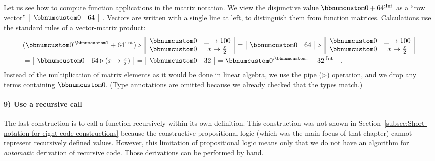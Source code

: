 Let us see how to compute function applications in the matrix notation.
We view the disjunctive value $\bbnum 0+64^{:\text{Int}}$ as a \textsf{``}row
vector\textsf{''} $\,\begin{array}{|cc|}
\bbnum 0 & 64\end{array}$~. Vectors are written with a single line at left, to distinguish
them from function matrices. Calculations use the standard rules of
a vector-matrix product:
\begin{align*}
 & (\bbnum 0^{:\bbnum 1}+64^{:\text{Int}})\triangleright\,\begin{array}{||cc|}
\bbnum 0 & \_\rightarrow100\\
\bbnum 0 & x\rightarrow\frac{x}{2}
\end{array}\,=\,\begin{array}{|cc|}
\bbnum 0 & 64\end{array}\,\triangleright\,\begin{array}{||cc|}
\bbnum 0 & \_\rightarrow100\\
\bbnum 0 & x\rightarrow\frac{x}{2}
\end{array}\\
 & =\,\begin{array}{|cc|}
\bbnum 0 & 64\triangleright(x\rightarrow\frac{x}{2})\end{array}\,=\,\begin{array}{|cc|}
\bbnum 0 & 32\end{array}\,=\bbnum 0^{:\bbnum 1}+32^{:\text{Int}}\quad.
\end{align*}
Instead of the multiplication of matrix elements as it would be done
in linear algebra, we use the pipe ($\triangleright$) operation,
and we drop any terms containing $\bbnum 0$. (Type annotations are
omitted because we already checked that the types match.) 

\paragraph{9) Use a recursive call}

The last construction is to call a function recursively within its
own definition. This construction was not shown in Section~\ref{subsec:Short-notation-for-eight-code-constructions}
because the constructive propositional logic (which was the main focus
of that chapter) cannot represent recursively defined values. However,
this limitation of propositional logic means only that we do not have
an algorithm for \emph{automatic} derivation of recursive code. Those
derivations can be performed by hand. 

